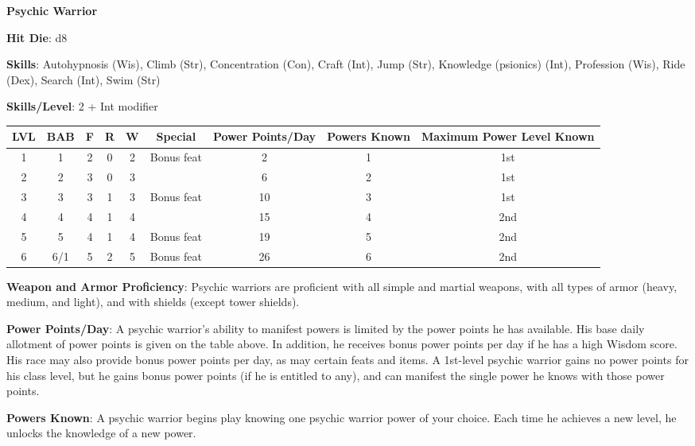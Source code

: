 \textbf{\huge{Psychic Warrior}}

\textbf{Hit Die}: d8

\textbf{Skills}: Autohypnosis (Wis), Climb (Str), Concentration (Con), Craft (Int), Jump (Str), Knowledge (psionics) (Int), Profession (Wis), Ride (Dex), Search (Int), Swim (Str)

\textbf{Skills/Level}: 2 + Int modifier

\begin{center}
\begin{adjustwidth}{-4cm}{}
\begin{small}
\begin{tabular}{| c | c | c | c | c | c | c | c | c |}
\hline
LVL &BAB &F &R &W &Special &Power Points/Day &Powers Known &Maximum Power Level Known \\
\hline
1 &1 &2 &0 &2 &Bonus feat &2 &1 &1st \\
2 &2 &3 &0 &3 & &6 &2 &1st \\
3 &3 &3 &1 &3 &Bonus feat &10 &3 &1st \\
4 &4 &4 &1 &4 & &15 &4 &2nd \\
5 &5 &4 &1 &4 &Bonus feat &19 &5 &2nd \\
6 &6/1 &5 &2 &5 &Bonus feat &26 &6 &2nd \\
\hline
\end{tabular}
\end{small}
\end{adjustwidth}
\end{center}

\textbf{Weapon and Armor Proficiency}: Psychic warriors are proficient with all simple and martial weapons, with all types of armor (heavy, medium, and light), and with shields (except tower shields).

\textbf{Power Points/Day}: A psychic warrior’s ability to manifest powers is limited by the power points he has available. His base daily allotment of power points is given on the table above. In addition, he receives bonus power points per day if he has a high Wisdom score. His race may also provide bonus power points per day, as may certain feats and items. A 1st-level psychic warrior gains no power points for his class level, but he gains bonus power points (if he is entitled to any), and can manifest the single power he knows with those power points.

\textbf{Powers Known}: A psychic warrior begins play knowing one psychic warrior power of your choice. Each time he achieves a new level, he unlocks the knowledge of a new power.


